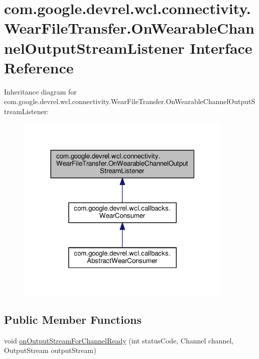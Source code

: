 \hypertarget{interfacecom_1_1google_1_1devrel_1_1wcl_1_1connectivity_1_1WearFileTransfer_1_1OnWearableChannelOutputStreamListener}{}\section{com.\+google.\+devrel.\+wcl.\+connectivity.\+Wear\+File\+Transfer.\+On\+Wearable\+Channel\+Output\+Stream\+Listener Interface Reference}
\label{interfacecom_1_1google_1_1devrel_1_1wcl_1_1connectivity_1_1WearFileTransfer_1_1OnWearableChannelOutputStreamListener}


Inheritance diagram for com.\+google.\+devrel.\+wcl.\+connectivity.\+Wear\+File\+Transfer.\+On\+Wearable\+Channel\+Output\+Stream\+Listener\+:
\nopagebreak
\begin{figure}[H]
\begin{center}
\leavevmode
\includegraphics[width=294pt]{d5/d7c/interfacecom_1_1google_1_1devrel_1_1wcl_1_1connectivity_1_1WearFileTransfer_1_1OnWearableChanneld70b9d7138a105aaeef3a617c387a1af}
\end{center}
\end{figure}
\subsection*{Public Member Functions}
\begin{DoxyCompactItemize}
\item 
void \hyperlink{interfacecom_1_1google_1_1devrel_1_1wcl_1_1connectivity_1_1WearFileTransfer_1_1OnWearableChannelOutputStreamListener_abcb9123c27d9ece5365b99571a708f60}{on\+Output\+Stream\+For\+Channel\+Ready} (int status\+Code, Channel channel, Output\+Stream output\+Stream)
\end{DoxyCompactItemize}


